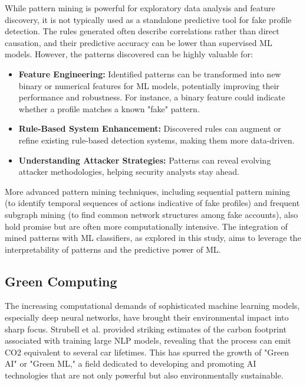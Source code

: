 \documentclass[conference]{IEEEtran}
\begin{document}
While pattern mining is powerful for exploratory data analysis and feature discovery, it is not typically used as a standalone predictive tool for fake profile detection. The rules generated often describe correlations rather than direct causation, and their predictive accuracy can be lower than supervised ML models. However, the patterns discovered can be highly valuable for:
\begin{itemize}
    \item \textbf{Feature Engineering:} Identified patterns can be transformed into new binary or numerical features for ML models, potentially improving their performance and robustness. For instance, a binary feature could indicate whether a profile matches a known "fake" pattern.
    \item \textbf{Rule-Based System Enhancement:} Discovered rules can augment or refine existing rule-based detection systems, making them more data-driven.
    \item \textbf{Understanding Attacker Strategies:} Patterns can reveal evolving attacker methodologies, helping security analysts stay ahead.
\end{itemize}
More advanced pattern mining techniques, including sequential pattern mining (to identify temporal sequences of actions indicative of fake profiles) and frequent subgraph mining (to find common network structures among fake accounts), also hold promise but are often more computationally intensive. The integration of mined patterns with ML classifiers, as explored in this study, aims to leverage the interpretability of patterns and the predictive power of ML.

\subsection{Green Computing}
The increasing computational demands of sophisticated machine learning models, especially deep neural networks, have brought their environmental impact into sharp focus. Strubell et al. \cite{b4} provided striking estimates of the carbon footprint associated with training large NLP models, revealing that the process can emit CO2 equivalent to several car lifetimes. This has spurred the growth of "Green AI" or "Green ML," a field dedicated to developing and promoting AI technologies that are not only powerful but also environmentally sustainable.
\end{document}
